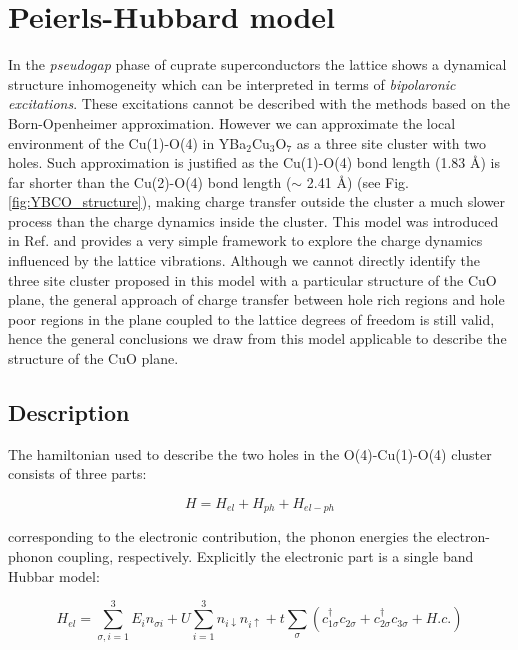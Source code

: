 \chapter{Peierls-Hubbard model}

In the \textit{pseudogap} phase of cuprate superconductors the lattice shows a dynamical structure inhomogeneity which can be interpreted in terms of \textit{bipolaronic excitations}. 
These excitations cannot be described with the methods based on the Born-Openheimer approximation.
However we can approximate the local environment of the Cu(1)-O(4) in YBa$_{2}$Cu$_{3}$O$_{7}$ as a three site cluster with two holes.
Such approximation is justified as the Cu(1)-O(4) bond length (1.83 \AA) is far shorter than the Cu(2)-O(4) bond length ($\sim$ 2.41 \AA) (see Fig. \ref{fig:YBCO_structure}), making charge transfer outside the cluster a much slower process than the charge dynamics inside the cluster. 
This model was introduced in Ref. \cite{MustredeLeon1992} and provides a very simple framework to explore the charge dynamics influenced by the lattice vibrations. 
Although we cannot directly identify the three site cluster proposed in this model with a particular structure of the CuO plane, the general approach of charge transfer between hole rich regions and hole poor regions in the plane coupled to the lattice degrees of freedom is still valid, hence the general conclusions we draw from this model applicable to describe the structure of the CuO plane.

\section{Description}

The hamiltonian used to describe the two holes in the O(4)-Cu(1)-O(4) cluster consists of three parts\cite{Salkola1994}:

\begin{equation}\label{eq:full-hamiltonian}
H = H_{el} + H_{ph} + H_{el-ph}
\end{equation}

\noindent corresponding to the electronic contribution, the phonon energies the electron-phonon coupling, respectively. 
Explicitly the electronic part is a single band Hubbar model:

\begin{equation}\label{eq:electronic-part}
H_{el} = \sum_{\sigma,i=1}^3 E_i n_{\sigma i} + U\sum_{i=1}^3 n_{i\downarrow}n_{i\uparrow} + t\sum_{\sigma}(c_{1\sigma}^\dagger c_{2\sigma} + c_{2\sigma}^\dagger c_{3\sigma} + H.c.)
\end{equation}


